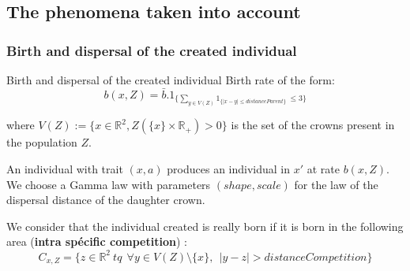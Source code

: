 \documentclass{myBeamer}
\newcommand{\R}{\mathbb R}%
\begin{document}
\subsection*{The phenomena taken into account}
\subsubsection*{Birth and dispersal of the created individual}

\begin{frame}{Birth and dispersal of the created individual}
Birth rate of the form:
\begin{equation*}
b(x,Z) = \bar{b}. 1_{\{ \sum_{y \in V(Z) } 1_{ \{  |x-y|\leq distanceParent \} } ~ \leq 3  \}  }
\end{equation*}

where $V(Z) := \{ x \in \R^2, Z( \{x\} \times  \R_+ ) >0  \}$ is the set of the crowns present in the population $Z$. 

\bigbreak
\begin{minipage}{0.55\linewidth}
An individual with trait $(x,a)$ produces an individual in $x'$ at rate $b(x,Z)$.
We choose a Gamma law with parameters $(shape,scale)$ for the law of the dispersal distance of the daughter crown.
\end{minipage}
\begin{minipage}{0.35\linewidth}
\begin{figure}[H] 
\end{figure}
\end{minipage}

We consider that the individual created is really born if it is born in the following area (\textbf{intra spécific competition}) :
\begin{equation*}
 C_{x,Z} = \{  z \in \R^2 ~ tq  ~~\forall y \in V(Z)\setminus \{x \}, ~~ |y-z|>distanceCompetition \}  
\end{equation*} 

\end{frame}
\end{document}
